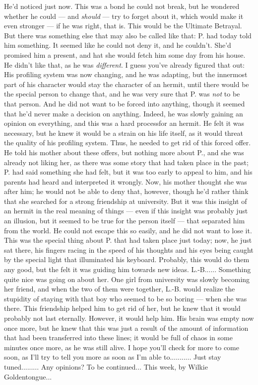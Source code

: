He'd noticed just now. 
This was a bond he could not break, but he wondered whether he could --- and \emph{should} --- try to forget about it, which would make it even stronger --- if he was right, that is. 
This would be the Ultimate Betrayal. 
But there was something else that may also be called like that: P. had today told him something. It seemed like he could not deny it, and he couldn't. She'd promised him a present, and hat she would fetch him some day from his house. 
He didn't like that, as he was \emph{different}. I guess you've already figured that out: His profiling system was now changing, and he was adapting, but the innermost part of his character would stay the character of an hermit, until there would be the special person to change that, and he was very sure that P. was \emph{not} to be that person. And he did not want to be forced into anything, though it seemed that he'd never make a decision on anything. 
Indeed, he was slowly gaining an opinion on everything, and this was a hard processfor an hermit. He felt it was necessary, but he knew it would be a strain on his life itself, as it would threat the quality of his profiling system. 
Thus, he needed to get rid of this forced offer. He told his mother about these offers, but nothing more about P., and she was already not liking her, as there was some story that had taken place in the past; P. had said something she had felt, but it was too early to appeal to him, and his parents had heard and interpreted it wrongly. 
Now, his mother thought she was after him; he would not be able to deny that, however, though he'd rather think that she searched for a strong friendship at university. But it was this insight of an hermit in the real meaning of things --- even if this insight was probably just an illusion, but it seemed to be true for the person itself --- that separated him from the world. He could not escape this so easily, and he did not want to lose it. 
This was the special thing about P. that had taken place just today; now, he just sat there, his fingers racing in the speed of his thoughts and his eyes being caught by the special light that illuminated his keyboard. Probably, this would do them any good, but the felt it was guiding him towards new ideas. 
L.-B......
Something quite nice was going on about her. One girl from university was slowly becoming her friend, and when the two of them were together, L.-B. would realize the stupidity of staying with that boy who seemed to be so boring --- when she was there. This friendship helped him to get rid of her, but he knew that it would probably not last eternally. However, it would help him. 
His brain was empty now once more, but he knew that this was just a result of the amount of information that had been transferred into these lines; it would be full of chaos in some minutes once more, as he was still alive. 
I hope you'll check for more to come soon, as I'll try to tell you more as soon as I'm able to...........
Just stay tuned.........
Any opinions?
To be continued...
This week, by Wilkie Goldentongue...

